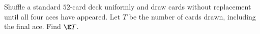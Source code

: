 Shuffle a standard $52$-card deck uniformly and draw cards without replacement until all four aces have appeared. Let $T$ be the number of cards drawn, including the final ace. Find $\E T$.
